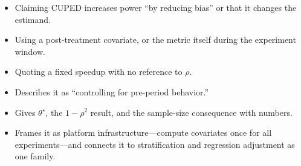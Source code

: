 \begin{interviewq}
\redflags
\begin{itemize}
    \item Claiming CUPED increases power ``by reducing bias'' or that it changes the estimand.
    \item Using a post-treatment covariate, or the metric itself during the experiment window.
    \item Quoting a fixed speedup with no reference to $\rho$.
\end{itemize}


\goodgreat
\begin{itemize}
    \item {} Describes it as ``controlling for pre-period behavior.''
    \item {} Gives $\theta^\star$, the $1-\rho^2$ result, and the sample-size consequence with numbers.
    \item {} Frames it as platform infrastructure---compute covariates once for all experiments---and connects it to stratification and regression adjustment as one family.
\end{itemize}

\end{interviewq}

